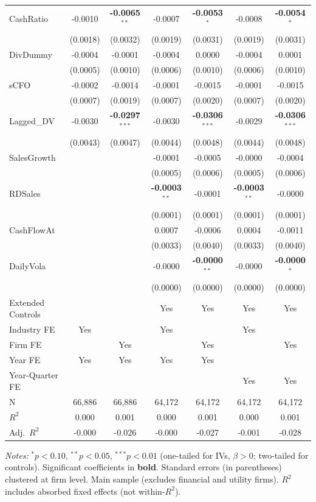 \begin{landscape}
\begin{table}[H]
\begin{tabular}{lcccccc}
CashRatio & -0.0010 & \textbf{-0.0065}$^{**}$ & -0.0007 & \textbf{-0.0053}$^{*}$ & -0.0008 & \textbf{-0.0054}$^{*}$ \\
 & (0.0018) & (0.0032) & (0.0019) & (0.0031) & (0.0019) & (0.0031) \\
DivDummy & -0.0004 & -0.0001 & -0.0004 & 0.0000 & -0.0004 & 0.0001 \\
 & (0.0005) & (0.0010) & (0.0006) & (0.0010) & (0.0006) & (0.0010) \\
sCFO & -0.0002 & -0.0014 & -0.0001 & -0.0015 & -0.0001 & -0.0015 \\
 & (0.0007) & (0.0019) & (0.0007) & (0.0020) & (0.0007) & (0.0020) \\
Lagged\_DV & -0.0030 & \textbf{-0.0297}$^{***}$ & -0.0030 & \textbf{-0.0306}$^{***}$ & -0.0029 & \textbf{-0.0306}$^{***}$ \\
 & (0.0043) & (0.0047) & (0.0044) & (0.0048) & (0.0044) & (0.0048) \\
SalesGrowth &  &  & -0.0001 & -0.0005 & -0.0000 & -0.0004 \\
 &  &  & (0.0005) & (0.0006) & (0.0005) & (0.0006) \\
RDSales &  &  & \textbf{-0.0003}$^{**}$ & -0.0001 & \textbf{-0.0003}$^{**}$ & -0.0000 \\
 &  &  & (0.0001) & (0.0001) & (0.0001) & (0.0001) \\
CashFlowAt &  &  & 0.0007 & -0.0006 & 0.0004 & -0.0011 \\
 &  &  & (0.0033) & (0.0040) & (0.0033) & (0.0040) \\
DailyVola &  &  & -0.0000 & \textbf{-0.0000}$^{**}$ & -0.0000 & \textbf{-0.0000}$^{*}$ \\
 &  &  & (0.0000) & (0.0000) & (0.0000) & (0.0000) \\
\midrule
Extended Controls &  &  & Yes & Yes & Yes & Yes \\
Industry FE & Yes &  & Yes &  & Yes &  \\
Firm FE &  & Yes &  & Yes &  & Yes \\
Year FE & Yes & Yes & Yes & Yes &  &  \\
Year-Quarter FE &  &  &  &  & Yes & Yes \\
\midrule
N & 66,886 & 66,886 & 64,172 & 64,172 & 64,172 & 64,172 \\
$R^2$ & 0.000 & 0.001 & 0.000 & 0.001 & 0.000 & 0.001 \\
Adj.~$R^2$ & -0.000 & -0.026 & -0.000 & -0.027 & -0.001 & -0.028 \\
\bottomrule
\end{tabular}
\begin{minipage}{\linewidth}
\vspace{2pt}\scriptsize
\textit{Notes:} $^{*}p<0.10$, $^{**}p<0.05$, $^{***}p<0.01$ (one-tailed for IVs, $\beta > 0$; two-tailed for controls).
 Significant coefficients in \textbf{bold}.
 Standard errors (in parentheses) clustered at firm level.
 Main sample (excludes financial and utility firms).
 $R^2$ includes absorbed fixed effects (not within-$R^2$).
\end{minipage}
\end{table}
\end{landscape}